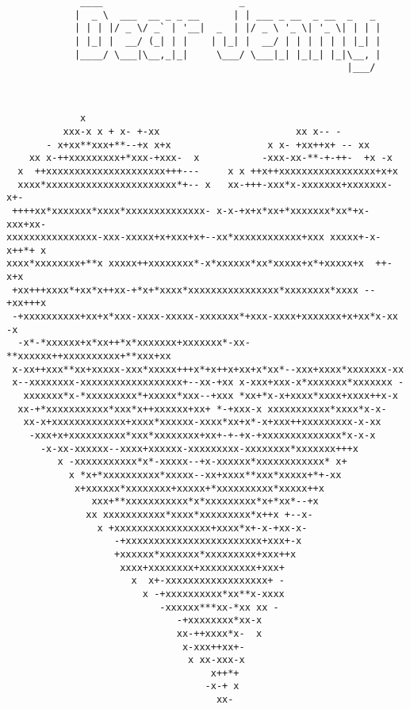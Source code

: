 \documentclass[a4paper,english]{article}
\begin{document}
\begin{verbatim}
             ____                        _
            |  _ \  ___  __ _ _ __      | | ___ _ __  _ __  _   _
            | | | |/ _ \/ _` | '__|  _  | |/ _ \ '_ \| '_ \| | | |
            | |_| |  __/ (_| | |    | |_| |  __/ | | | | | | |_| |
            |____/ \___|\__,_|_|     \___/ \___|_| |_|_| |_|\__, |
                                                            |___/
\end{verbatim}

\begin{verbatim}


             x              
          xxx-x x + x- +-xx                        xx x-- -
       - x+xx**xxx+**--+x x+x                 x x- +xx++x+ -- xx
    xx x-++xxxxxxxxx+*xxx-+xxx-  x           -xxx-xx-**-+-++-  +x -x
  x  ++xxxxxxxxxxxxxxxxxxxxx+++---     x x ++x++xxxxxxxxxxxxxxxxx+x+x
  xxxx*xxxxxxxxxxxxxxxxxxxxxxx*+-- x   xx-+++-xxx*x-xxxxxxx+xxxxxxx-x+-
 ++++xx*xxxxxxx*xxxx*xxxxxxxxxxxxxx- x-x-+x+x*xx+*xxxxxxx*xx*+x-xxx+xx-
xxxxxxxxxxxxxxxx-xxx-xxxxx+x+xxx+x+--xx*xxxxxxxxxxxx+xxx xxxxx+-x-x++*+ x
xxxx*xxxxxxxx+**x xxxxx++xxxxxxxx*-x*xxxxxx*xx*xxxxx+x*+xxxxx+x  ++- x+x
 +xx+++xxxx*+xx*x++xx-+*x+*xxxx*xxxxxxxxxxxxxxxx*xxxxxxxx*xxxx --+xx+++x
 -+xxxxxxxxxx+xx+x*xxx-xxxx-xxxxx-xxxxxxx*+xxx-xxxx+xxxxxxx+x+xx*x-xx -x
  -x*-*xxxxxx+x*xx++*x*xxxxxxx+xxxxxxx*-xx-**xxxxxx++xxxxxxxxxx+**xxx+xx
 x-xx++xxx**xx+xxxxx-xxx*xxxxx+++x*+x++x+xx+x*xx*--xxx+xxxx*xxxxxxx-xx
 x--xxxxxxxx-xxxxxxxxxxxxxxxxxx+--xx-+xx x-xxx+xxx-x*xxxxxxx*xxxxxxx -
   xxxxxxx*x-*xxxxxxxxx*+xxxxx*xxx--+xxx *xx+*x-x+xxxx*xxxx+xxxx++x-x
  xx-+*xxxxxxxxxxx*xxx*x++xxxxxx+xx+ *-+xxx-x xxxxxxxxxxx*xxxx*x-x-
   xx-x+xxxxxxxxxxxxx+xxxx*xxxxxx-xxxx*xx+x*-x+xxx++xxxxxxxxx-x-xx
    -xxx+x+xxxxxxxxxx*xxx*xxxxxxxx+xx+-+-+x-+xxxxxxxxxxxxxx*x-x-x
      -x-xx-xxxxxx--xxxx+xxxxxx-xxxxxxxxx-xxxxxxxx*xxxxxxx+++x
         x -xxxxxxxxxxx*x*-xxxxx--+x-xxxxxx*xxxxxxxxxxxx* x+
           x *x+*xxxxxxxxxx*xxxxx--xx+xxxx**xxx*xxxxx+*+-xx
            x+xxxxxx*xxxxxxxx+xxxxx+*xxxxxxxxxx*xxxxx++x
               xxx+**xxxxxxxxxxx*x*xxxxxxxxx*x+*xx*--+x
              xx xxxxxxxxxxx*xxxx*xxxxxxxxx*x++x +--x-
                x +xxxxxxxxxxxxxxxxx+xxxx*x+-x-+xx-x-
                   -+xxxxxxxxxxxxxxxxxxxxxxxx+xxx+-x
                   +xxxxxx*xxxxxxx*xxxxxxxxx+xxx++x
                    xxxx+xxxxxxxx+xxxxxxxxxx+xxx+
                      x  x+-xxxxxxxxxxxxxxxxxx+ -
                        x -+xxxxxxxxxx*xx**x-xxxx
                           -xxxxxx***xx-*xx xx -
                              -+xxxxxxxx*xx-x
                              xx-++xxxx*x-  x
                               x-xxx++xx+-
                                x xx-xxx-x
                                    x++*+
                                   -x-+ x
                                     xx-


\end{verbatim}
\color{black}
\end{document}
